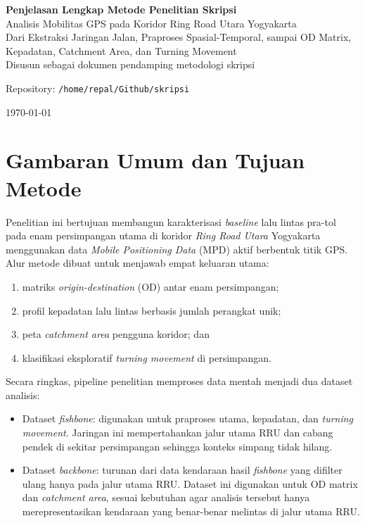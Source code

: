 \documentclass[11pt,a4paper]{article}
\newcommand{\RRU}{\textit{Ring Road Utara}}
\newcommand{\fishbone}{\textit{fishbone}}
\newcommand{\backbone}{\textit{backbone}}
\begin{document}
\begin{titlepage}
\centering
\vspace*{2.5cm}
{\Huge\bfseries Penjelasan Lengkap Metode Penelitian Skripsi\\[0.3em]}
{\Large Analisis Mobilitas GPS pada Koridor Ring Road Utara Yogyakarta\\[1.2em]}
{\large Dari Ekstraksi Jaringan Jalan, Praproses Spasial-Temporal, sampai OD Matrix, Kepadatan, Catchment Area, dan Turning Movement\\[2em]}
\vfill
{\large Disusun sebagai dokumen pendamping metodologi skripsi}\par
{\large Repository: \texttt{/home/repal/Github/skripsi}}\par
\vspace{1cm}
{\large \today}\par
\end{titlepage}

\tableofcontents
\newpage

\section{Gambaran Umum dan Tujuan Metode}
Penelitian ini bertujuan membangun karakterisasi \textit{baseline} lalu lintas pra-tol pada enam persimpangan utama di koridor \RRU{} Yogyakarta menggunakan data \textit{Mobile Positioning Data} (MPD) aktif berbentuk titik GPS. Alur metode dibuat untuk menjawab empat keluaran utama:
\begin{enumerate}
    \item matriks \textit{origin-destination} (OD) antar enam persimpangan;
    \item profil kepadatan lalu lintas berbasis jumlah perangkat unik;
    \item peta \textit{catchment area} pengguna koridor; dan
    \item klasifikasi eksploratif \textit{turning movement} di persimpangan.
\end{enumerate}

Secara ringkas, pipeline penelitian memproses data mentah menjadi dua dataset analisis:
\begin{itemize}
    \item Dataset \fishbone{}: digunakan untuk praproses utama, kepadatan, dan \textit{turning movement}. Jaringan ini mempertahankan jalur utama RRU dan cabang pendek di sekitar persimpangan sehingga konteks simpang tidak hilang.
    \item Dataset \backbone{}: turunan dari data kendaraan hasil \fishbone{} yang difilter ulang hanya pada jalur utama RRU. Dataset ini digunakan untuk OD matrix dan \textit{catchment area}, sesuai kebutuhan agar analisis tersebut hanya merepresentasikan kendaraan yang benar-benar melintas di jalur utama RRU.
\end{itemize}
\end{document}
